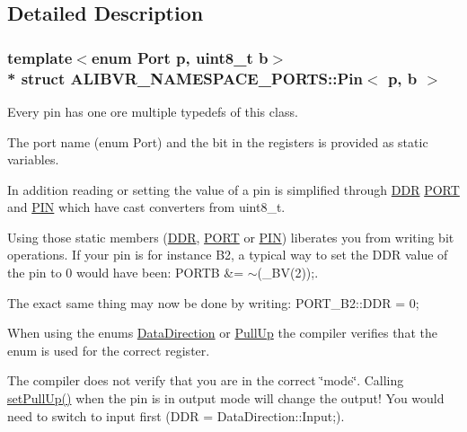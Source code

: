 \subsection{Detailed Description}
\subsubsection*{template$<$enum Port p, uint8\+\_\+t b$>$\\*
struct A\+L\+I\+B\+V\+R\+\_\+\+N\+A\+M\+E\+S\+P\+A\+C\+E\+\_\+\+P\+O\+R\+T\+S\+::\+Pin$<$ p, b $>$}

Every pin has one ore multiple typedefs of this class. 

The port name (enum Port) and the bit in the registers is provided as static variables.

In addition reading or setting the value of a pin is simplified through \hyperlink{structALIBVR__NAMESPACE__PORTS_1_1Pin_a91515b99dfbd7423ffa4771ec32bfbe8}{D\+DR} \hyperlink{structALIBVR__NAMESPACE__PORTS_1_1Pin_aaa60d0cc181d9170487e5429a3c63227}{P\+O\+RT} and \hyperlink{structALIBVR__NAMESPACE__PORTS_1_1Pin_a1db5d20ab305dba1701558e8fd2b94a7}{P\+IN} which have cast converters from uint8\+\_\+t.

Using those static members (\hyperlink{structALIBVR__NAMESPACE__PORTS_1_1Pin_a91515b99dfbd7423ffa4771ec32bfbe8}{D\+DR}, \hyperlink{structALIBVR__NAMESPACE__PORTS_1_1Pin_aaa60d0cc181d9170487e5429a3c63227}{P\+O\+RT} or \hyperlink{structALIBVR__NAMESPACE__PORTS_1_1Pin_a1db5d20ab305dba1701558e8fd2b94a7}{P\+IN}) liberates you from writing bit operations. If your pin is for instance B2, a typical way to set the D\+DR value of the pin to 0 would have been\+: {\ttfamily P\+O\+R\+TB \&= $\sim$(\+\_\+\+B\+V(2));}.

The exact same thing may now be done by writing\+: {\ttfamily P\+O\+R\+T\+\_\+\+B2\+::\+D\+DR = 0;}

When using the enums \hyperlink{namespaceALIBVR__NAMESPACE__PORTS_a1c84bd36a7c4d1204c926927f8534ed4}{Data\+Direction} or \hyperlink{namespaceALIBVR__NAMESPACE__PORTS_ac5b094ab18f4038d56ff1401ebe8d4f3}{Pull\+Up} the compiler verifies that the enum is used for the correct register.

The compiler does not verify that you are in the correct \char`\"{}mode\char`\"{}. Calling \hyperlink{structALIBVR__NAMESPACE__PORTS_1_1Pin_a791a81a5047ad74dfae3837d4e4f871d}{set\+Pull\+Up()} when the pin is in output mode will change the output! You would need to switch to input first ({\ttfamily D\+DR = Data\+Direction\+::\+Input;}). 

